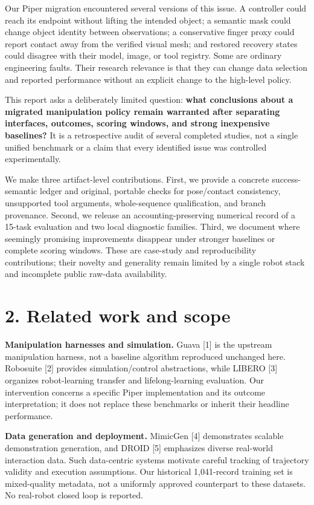 \documentclass[10pt]{article}
\begin{document}
Our Piper migration encountered several versions of this issue. A controller could reach its endpoint without lifting the intended object; a semantic mask could change object identity between observations; a conservative finger proxy could report contact away from the verified visual mesh; and restored recovery states could disagree with their model, image, or tool registry. Some are ordinary engineering faults. Their research relevance is that they can change data selection and reported performance without an explicit change to the high-level policy.

This report asks a deliberately limited question: \textbf{what conclusions about a migrated manipulation policy remain warranted after separating interfaces, outcomes, scoring windows, and strong inexpensive baselines?} It is a retrospective audit of several completed studies, not a single unified benchmark or a claim that every identified issue was controlled experimentally.

We make three artifact-level contributions. First, we provide a concrete success-semantic ledger and original, portable checks for pose/contact consistency, unsupported tool arguments, whole-sequence qualification, and branch provenance. Second, we release an accounting-preserving numerical record of a 15-task evaluation and two local diagnostic families. Third, we document where seemingly promising improvements disappear under stronger baselines or complete scoring windows. These are case-study and reproducibility contributions; their novelty and generality remain limited by a single robot stack and incomplete public raw-data availability.

\section*{2. Related work and scope}

\textbf{Manipulation harnesses and simulation.} Guava [1] is the upstream manipulation harness, not a baseline algorithm reproduced unchanged here. Robosuite [2] provides simulation/control abstractions, while LIBERO [3] organizes robot-learning transfer and lifelong-learning evaluation. Our intervention concerns a specific Piper implementation and its outcome interpretation; it does not replace these benchmarks or inherit their headline performance.

\textbf{Data generation and deployment.} MimicGen [4] demonstrates scalable demonstration generation, and DROID [5] emphasizes diverse real-world interaction data. Such data-centric systems motivate careful tracking of trajectory validity and execution assumptions. Our historical 1,041-record training set is mixed-quality metadata, not a uniformly approved counterpart to these datasets. No real-robot closed loop is reported.
\end{document}
